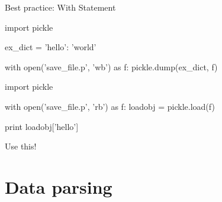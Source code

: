 \documentclass[xcolor=table,10pt,handout]{beamer}
\begin{document}
\begin{frame}[fragile]{Best practice: With Statement}


  \begin{mlinepython}
    import pickle 

    ex_dict = {'hello': 'world'}

    with open('save_file.p', 'wb') as f:
        pickle.dump(ex_dict, f)
  \end{mlinepython}

  \bigskip \pause
  \vspace{0.2cm}

  \begin{mlinepython}
    import pickle 

    with open('save_file.p', 'rb') as f:
        loadobj = pickle.load(f)

    print loadobj['hello']
  \end{mlinepython}
  \vspace{0.15cm}
  \begin{arrowlist}
  \item Use this!
  \end{arrowlist}

\end{frame}
















\section{Data parsing}
\end{document}

